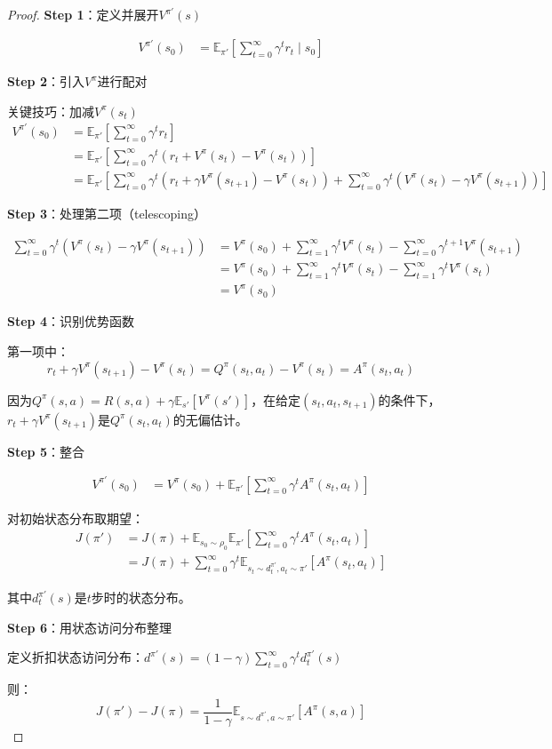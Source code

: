\documentclass[11pt,a4paper]{article}
\theoremstyle{definition}
\begin{document}
\begin{proof}
\textbf{Step 1}：定义并展开$V^{\pi'}(s)$

\begin{align*}
V^{\pi'}(s_0) &= \mathbb{E}_{\pi'}\left[\sum_{t=0}^\infty \gamma^t r_t \mid s_0\right]
\end{align*}

\textbf{Step 2}：引入$V^\pi$进行配对

关键技巧：加减$V^\pi(s_t)$
\begin{align*}
V^{\pi'}(s_0) &= \mathbb{E}_{\pi'}\left[\sum_{t=0}^\infty \gamma^t r_t\right] \\
&= \mathbb{E}_{\pi'}\left[\sum_{t=0}^\infty \gamma^t (r_t + V^\pi(s_t) - V^\pi(s_t))\right] \\
&= \mathbb{E}_{\pi'}\left[\sum_{t=0}^\infty \gamma^t (r_t + \gamma V^\pi(s_{t+1}) - V^\pi(s_t)) + \sum_{t=0}^\infty \gamma^t(V^\pi(s_t) - \gamma V^\pi(s_{t+1}))\right]
\end{align*}

\textbf{Step 3}：处理第二项（telescoping）

\begin{align*}
\sum_{t=0}^\infty \gamma^t(V^\pi(s_t) - \gamma V^\pi(s_{t+1})) &= V^\pi(s_0) + \sum_{t=1}^\infty \gamma^t V^\pi(s_t) - \sum_{t=0}^\infty \gamma^{t+1} V^\pi(s_{t+1}) \\
&= V^\pi(s_0) + \sum_{t=1}^\infty \gamma^t V^\pi(s_t) - \sum_{t=1}^\infty \gamma^t V^\pi(s_t) \\
&= V^\pi(s_0)
\end{align*}

\textbf{Step 4}：识别优势函数

第一项中：
\[
r_t + \gamma V^\pi(s_{t+1}) - V^\pi(s_t) = Q^\pi(s_t, a_t) - V^\pi(s_t) = A^\pi(s_t, a_t)
\]

因为$Q^\pi(s,a) = R(s,a) + \gamma \mathbb{E}_{s'}[V^\pi(s')]$，在给定$(s_t, a_t, s_{t+1})$的条件下，$r_t + \gamma V^\pi(s_{t+1})$是$Q^\pi(s_t, a_t)$的无偏估计。

\textbf{Step 5}：整合

\begin{align*}
V^{\pi'}(s_0) &= V^\pi(s_0) + \mathbb{E}_{\pi'}\left[\sum_{t=0}^\infty \gamma^t A^\pi(s_t, a_t)\right]
\end{align*}

对初始状态分布取期望：
\begin{align*}
J(\pi') &= J(\pi) + \mathbb{E}_{s_0 \sim \rho_0}\mathbb{E}_{\pi'}\left[\sum_{t=0}^\infty \gamma^t A^\pi(s_t, a_t)\right] \\
&= J(\pi) + \sum_{t=0}^\infty \gamma^t \mathbb{E}_{s_t \sim d^{\pi'}_t, a_t \sim \pi'}\left[A^\pi(s_t, a_t)\right]
\end{align*}

其中$d^{\pi'}_t(s)$是$t$步时的状态分布。

\textbf{Step 6}：用状态访问分布整理

定义折扣状态访问分布：$d^{\pi'}(s) = (1-\gamma)\sum_{t=0}^\infty \gamma^t d^{\pi'}_t(s)$

则：
\[
J(\pi') - J(\pi) = \frac{1}{1-\gamma} \mathbb{E}_{s \sim d^{\pi'}, a \sim \pi'}\left[A^\pi(s, a)\right]
\]
\end{proof}
\end{document}
